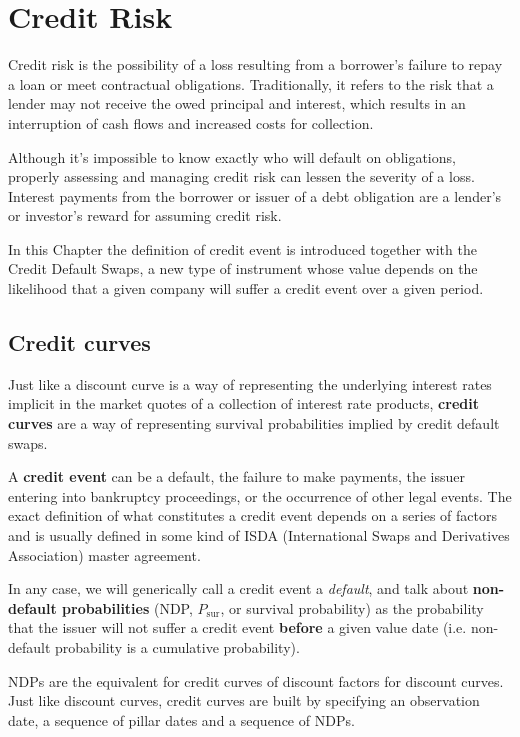 \chapter{Credit Risk}\label{credit_default_swaps}

Credit risk is the possibility of a loss resulting from a borrower's failure to repay a loan or meet contractual obligations. Traditionally, it refers to the risk that a lender may not receive the owed principal and interest, which results in an interruption of cash flows and increased costs for collection. 

Although it's impossible to know exactly who will default on obligations, properly assessing and managing credit risk can lessen the severity of a loss. Interest payments from the borrower or issuer of a debt obligation are a lender's or investor's reward for assuming credit risk.

In this Chapter the definition of credit event is introduced together with the Credit Default Swaps, a new type of instrument whose value depends on the likelihood that a given company will suffer a credit event over a given period.

\section{Credit curves}\label{credit-curves}

Just like a discount curve is a way of representing the underlying interest rates implicit in the market quotes of a collection of interest rate products, \textbf{credit curves} are a way of representing survival probabilities implied by credit default swaps.

A \textbf{credit event} can be a default, the failure to make payments, the issuer entering into bankruptcy proceedings, or the occurrence of other legal events. The exact definition of what constitutes a credit event depends on a series of factors and is usually defined in some kind of ISDA (International Swaps and Derivatives Association) master agreement.

In any case, we will generically call a credit event a \emph{default}, and talk about \textbf{non-default probabilities} (NDP, $P_{\textrm{sur}}$, or survival probability) as the probability that the issuer will not suffer a credit event \textbf{before} a given value date (i.e. non-default probability is a cumulative probability).

NDPs are the equivalent for credit curves of discount factors for discount curves. Just like discount curves, credit curves are built by specifying an observation date, a sequence of pillar dates and a sequence of NDPs. 

